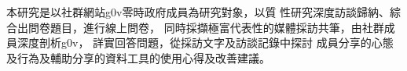 \StartChiAbstract

本研究是以社群網站g0v零時政府成員為研究對象，以質
性研究深度訪談歸納、綜合出問卷題目，進行線上問卷，
同時採擷極富代表性的媒體採訪共筆，由社群成員深度剖析g0v，
詳實回答問題，從採訪文字及訪談記錄中探討
成員分享的心態及行為及輔助分享的資料工具的使用心得及改善建議。

\EndChiAbstract
